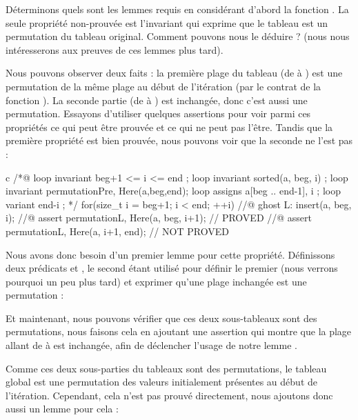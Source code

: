 Déterminons quels sont les lemmes requis en considérant d'abord la fonction
. La seule propriété non-prouvée est l'invariant qui
exprime que le tableau est un permutation du tableau original. Comment pouvons
nous le déduire ? (nous nous intéresserons aux preuves de ces lemmes plus tard).



Nous pouvons observer deux faits : la première plage du tableau (de
 à ) est une permutation de la même plage au
début de l'itération (par le contrat de la fonction ). La
seconde partie (de  à ) est inchangée, donc
c'est aussi une permutation. Essayons d'utiliser quelques assertions pour voir
parmi ces propriétés ce qui peut être prouvée et ce qui ne peut pas l'être.
Tandis que la première propriété est bien prouvée, nous pouvons voir que la
seconde ne l'est pas :



\begin{CodeBlock}{c}
  /*@
    loop invariant beg+1 <= i <= end ;
    loop invariant sorted(a, beg, i) ;
    loop invariant permutation{Pre, Here}(a,beg,end);
    loop assigns a[beg .. end-1], i ;
    loop variant end-i ;
  */
  for(size_t i = beg+1; i < end; ++i) {
    //@ ghost L:
    insert(a, beg, i);
    //@ assert permutation{L, Here}(a, beg, i+1); // PROVED
    //@ assert permutation{L, Here}(a, i+1, end); // NOT PROVED
  }
\end{CodeBlock}


Nous avons donc besoin d'un premier lemme pour cette propriété. Définissons
deux prédicats  et , le second
étant utilisé pour définir le premier (nous verrons pourquoi un peu plus
tard) et exprimer qu'une plage inchangée est une permutation :





Et maintenant, nous pouvons vérifier que ces deux sous-tableaux sont des
permutations, nous faisons cela en ajoutant une assertion qui montre que la
plage allant de  à  est inchangée, afin de
déclencher l'usage de notre lemme .




Comme ces deux sous-parties du tableaux sont des permutations, le tableau
global est une permutation des valeurs initialement présentes au début de
l'itération. Cependant, cela n'est pas prouvé directement, nous ajoutons
donc aussi un lemme pour cela :


